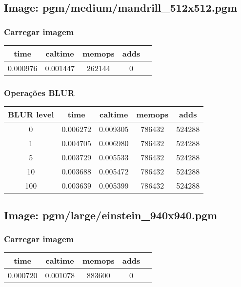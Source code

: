 \documentclass{report}
\begin{document}
\subsection*{Image: pgm/medium/mandrill\_512x512.pgm}

\subsubsection*{Carregar imagem}
\begin{tabular}{ccccc}
\toprule
\textbf{time} & \textbf{caltime} & \textbf{memops} & \textbf{adds} \\
\midrule
0.000976 & 0.001447 & 262144 & 0 \\
\bottomrule
\end{tabular}

\subsubsection*{Operações BLUR}
\begin{tabular}{ccccc}
\toprule
\textbf{BLUR level} & \textbf{time} & \textbf{caltime} & \textbf{memops} & \textbf{adds} \\
\midrule
0 & 0.006272 & 0.009305 & 786432 & 524288 \\
1 & 0.004705 & 0.006980 & 786432 & 524288 \\
5 & 0.003729 & 0.005533 & 786432 & 524288 \\
10 & 0.003688 & 0.005472 & 786432 & 524288 \\
100 & 0.003639 & 0.005399 & 786432 & 524288 \\
\bottomrule
\end{tabular}

\subsection*{Image: pgm/large/einstein\_940x940.pgm}

\subsubsection*{Carregar imagem}
\begin{tabular}{ccccc}
\toprule
\textbf{time} & \textbf{caltime} & \textbf{memops} & \textbf{adds} \\
\midrule
0.000720 & 0.001078 & 883600 & 0 \\
\bottomrule
\end{tabular}
\end{document}
